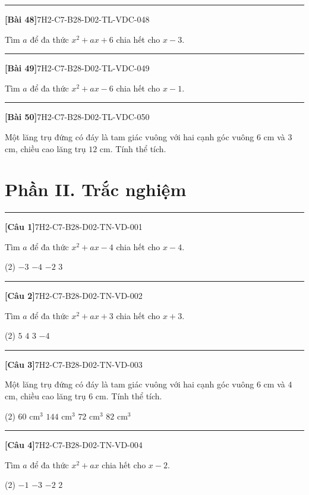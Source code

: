\documentclass[12pt,a4paper]{article}
\newif\ifloigiai
\newenvironment{cauhoi}[2]{%
  \par\medskip\noindent\rule{\textwidth}{0.4pt}\par\nopagebreak
  \noindent\textbf{[#1]}\hfill{\scriptsize\ttfamily #2}\par\nopagebreak\smallskip}{\par}
\newcommand{\loigiai}[1]{\ifloigiai\par\smallskip\noindent\textit{Lời giải.} #1\par\fi}
\newcommand{\dapan}[1]{\ifloigiai\par\smallskip\noindent\textit{Đáp án:} \textbf{#1}\par\fi}
\begin{document}
\begin{cauhoi}{Bài 48}{7H2-C7-B28-D02-TL-VDC-048}
Tìm $a$ để đa thức $x^{2}+ax+6$ chia hết cho $x-3$.
\loigiai{Đa thức chia hết cho $x-3$ khi $x=3$ là nghiệm: $9+3a+6=0$, suy ra $a=-5$.}
\end{cauhoi}
\begin{cauhoi}{Bài 49}{7H2-C7-B28-D02-TL-VDC-049}
Tìm $a$ để đa thức $x^{2}+ax-6$ chia hết cho $x-1$.
\loigiai{Đa thức chia hết cho $x-1$ khi $x=1$ là nghiệm: $1+a-6=0$, suy ra $a=5$.}
\end{cauhoi}
\begin{cauhoi}{Bài 50}{7H2-C7-B28-D02-TL-VDC-050}
Một lăng trụ đứng có đáy là tam giác vuông với hai cạnh góc vuông $6$ cm và $3$ cm, chiều cao lăng trụ $12$ cm. Tính thể tích.
\loigiai{Diện tích đáy là $\dfrac{6\cdot 3}{2}=9$ ($\text{cm}^2$). Thể tích là $9\cdot 12=108$ ($\text{cm}^3$).}
\end{cauhoi}
\clearpage\section*{Phần II. Trắc nghiệm}
\begin{cauhoi}{Câu 1}{7H2-C7-B28-D02-TN-VD-001}
Tìm $a$ để đa thức $x^{2}+ax-4$ chia hết cho $x-4$.
\begin{tasks}(2)
\task $-3$
\task $-4$
\task $-2$
\task $3$
\end{tasks}
\dapan{A}
\end{cauhoi}
\begin{cauhoi}{Câu 2}{7H2-C7-B28-D02-TN-VD-002}
Tìm $a$ để đa thức $x^{2}+ax+3$ chia hết cho $x+3$.
\begin{tasks}(2)
\task $5$
\task $4$
\task $3$
\task $-4$
\end{tasks}
\dapan{B}
\end{cauhoi}
\begin{cauhoi}{Câu 3}{7H2-C7-B28-D02-TN-VD-003}
Một lăng trụ đứng có đáy là tam giác vuông với hai cạnh góc vuông $6$ cm và $4$ cm, chiều cao lăng trụ $6$ cm. Tính thể tích.
\begin{tasks}(2)
\task $60\text{ cm}^3$
\task $144\text{ cm}^3$
\task $72\text{ cm}^3$
\task $82\text{ cm}^3$
\end{tasks}
\dapan{C}
\end{cauhoi}
\begin{cauhoi}{Câu 4}{7H2-C7-B28-D02-TN-VD-004}
Tìm $a$ để đa thức $x^{2}+ax$ chia hết cho $x-2$.
\begin{tasks}(2)
\task $-1$
\task $-3$
\task $-2$
\task $2$
\end{tasks}
\dapan{C}
\end{cauhoi}
\end{document}

